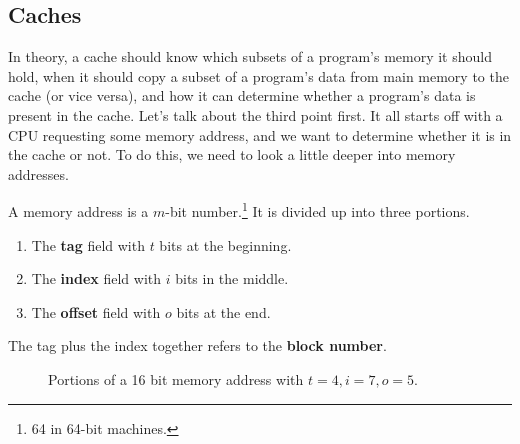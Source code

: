 \subsection{Caches}

  In theory, a cache should know which subsets of a program's memory it should hold, when it should copy a subset of a program's data from main memory to the cache (or vice versa), and how it can determine whether a program's data is present in the cache. Let's talk about the third point first. It all starts off with a CPU requesting some memory address, and we want to determine whether it is in the cache or not. To do this, we need to look a little deeper into memory addresses. 

  \begin{definition}
    A memory address is a $m$-bit number.\footnote{64 in 64-bit machines.} It is divided up into three portions. 
    \begin{enumerate}
      \item The \textbf{tag} field with $t$ bits at the beginning.
      \item The \textbf{index} field with $i$ bits in the middle. 
      \item The \textbf{offset} field with $o$ bits at the end.
    \end{enumerate}
    The tag plus the index together refers to the \textbf{block number}. 
    \begin{figure}[H]
      \centering 
      \caption{Portions of a 16 bit memory address with $t = 4, i = 7, o = 5$. } 
      \label{fig:memory_portions}
    \end{figure}
  \end{definition}

